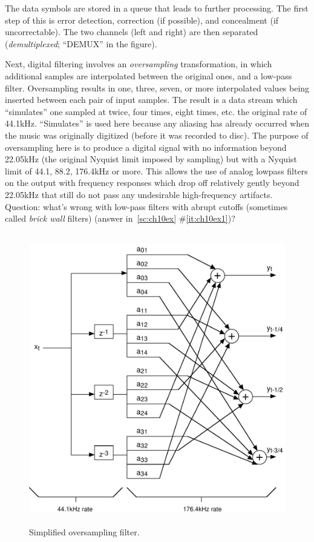The data symbols are stored in a queue that leads to further
processing.  The first step of this is error detection, correction (if
possible), and concealment (if uncorrectable). The two channels (left
and right) are then separated (\emph{demultiplexed}; ``DEMUX'' in the
figure). 

Next, digital filtering involves an \emph{oversampling}
transformation, in which additional samples are interpolated between
the original ones, and a low-pass filter. Oversampling results in one,
three, seven, or more interpolated values being inserted between each
pair of input samples. The result is a data stream which ``simulates''
one sampled at twice, four times, eight times, etc. the original rate
of 44.1kHz. ``Simulates'' is used here because any aliasing has already
occurred when the music was originally digitized (before it was
recorded to disc). The purpose of oversampling here is to produce a
digital signal with no information beyond 22.05kHz (the original Nyquist
limit imposed by sampling) but with a Nyquist limit of 44.1, 88.2,
176.4kHz or more. This allows the use of analog lowpass filters on the
output with frequency responses which drop off relatively gently
beyond 22.05kHz that still do not pass any undesirable high-frequency
artifacts.  Question: what's wrong with low-pass filters with abrupt
cutoffs (sometimes called \emph{brick wall} filters) (answer
in~\ref{sc:ch10ex}
\#\ref{it:ch10ex1})?

\begin{figure}
\centerline{\includegraphics[height=5in]{ch-rev/fig10-3}}
\caption{Simplified oversampling filter.\label{fg:oversampling}}
\end{figure}

